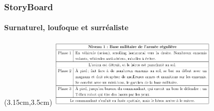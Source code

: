 \begin{frame}

	\frametitle{StoryBoard}
	\framesubtitle{Surnaturel, loufoque et surréaliste}
	
	\begin{textblock*}{8cm}(3.15cm,3.5cm)
		\includegraphics[width=8cm]{figures/storyboard.png}
	\end{textblock*}
	
\end{frame}
